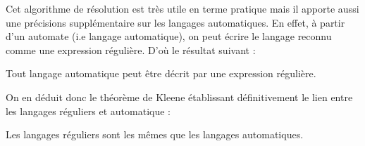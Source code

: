 Cet algorithme de résolution est très utile en terme pratique mais il apporte aussi une précisions supplémentaire sur 
les langages automatiques. En effet, à partir d'un automate (i.e langage automatique), on peut écrire le langage 
reconnu comme une expression régulière. D'où le résultat suivant : 

\begin{prop}
    Tout langage automatique peut être décrit par une expression régulière. 
\end{prop}

On en déduit donc le théorème de Kleene établissant définitivement le lien entre les langages réguliers et automatique : 

\begin{theorem}[Kleene]
    Les langages réguliers sont les mêmes que les langages automatiques. 
\end{theorem}




